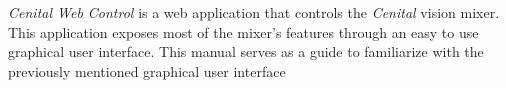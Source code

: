\documentclass[../main.tex]{subfiles}
\begin{document}
\textit{Cenital Web Control} is a web application that controls the \textit{Cenital} vision mixer. This application exposes most of the mixer's features through an easy to use graphical user interface. This manual serves as a guide to familiarize with the previously mentioned graphical user interface
\end{document}
